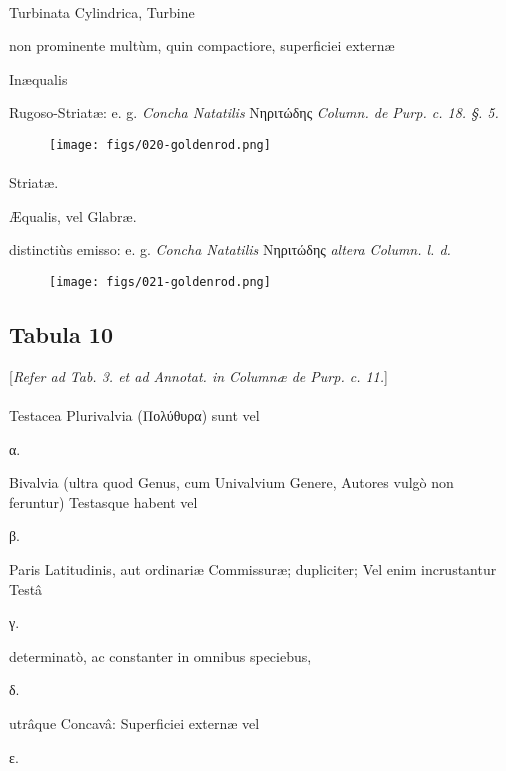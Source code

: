 \documentclass[a4paper, 11pt, oneside, polutonikogreek, german]{article}
\begin{document}
\paragraph{}
Turbinata Cylindrica, Turbine

non prominente multùm, quin compactiore, superficiei externæ

Inæqualis

Rugoso-Striatæ: e. g. \emph{Concha Natatilis} Νηριτώδης \emph{Column. de Purp. c. 18. §. 5.}

\begin{figure}[H]
\centering
\texttt{[image: figs/020-goldenrod.png]}
\end{figure}
\paragraph{}
Striatæ.

Æqualis, vel Glabræ.

distinctiùs emisso: e. g. \emph{Concha Natatilis} Νηριτώδης \emph{altera Column. l. d.}

\begin{figure}[H]
\centering
\texttt{[image: figs/021-goldenrod.png]}
\end{figure}
\clearpage
\subsection{Tabula 10}
\begin{center}
[\emph{Refer ad Tab. 3. et ad Annotat. in Columnæ de Purp. c. 11.}]
\end{center}
\paragraph{}
Testacea Plurivalvia (Πολύθυρα) sunt vel

α.

Bivalvia (ultra quod Genus, cum Univalvium Genere, Autores vulgò non feruntur) Testasque habent vel

β.

Paris Latitudinis, aut ordinariæ Commissuræ; dupliciter; Vel enim incrustantur Testâ

γ.

determinatò, ac constanter in omnibus speciebus,

δ.

utrâque Concavâ: Superficiei externæ vel

ε.
\end{document}
